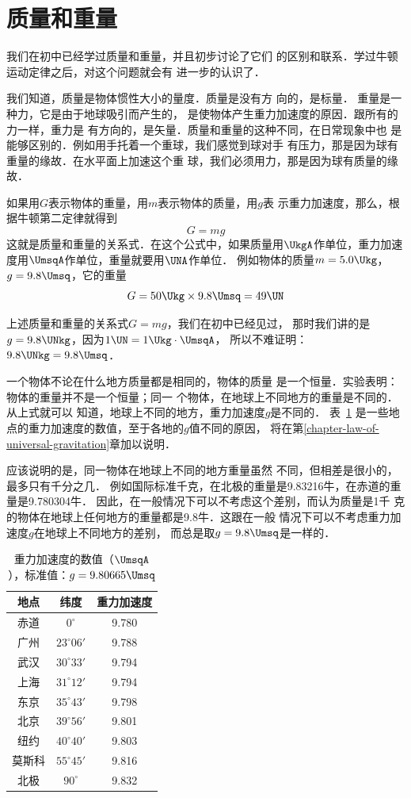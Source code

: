 \section{质量和重量}
我们在初中已经学过质量和重量，并且初步讨论了它们
的区别和联系．学过牛顿运动定律之后，对这个问题就会有
进一步的认识了．

我们知道，质量是物体惯性大小的量度．质量是没有方
向的，是标量．
重量是一种力，它是由于地球吸引而产生的，
是使物体产生重力加速度的原因．跟所有的力一样，重力是
有方向的，是矢量．质量和重量的这种不同，在日常现象中也
是能够区别的．例如用手托着一个重球，我们感觉到球对手
有压力，那是因为球有重量的缘故．在水平面上加速这个重
球，我们必须用力，那是因为球有质量的缘故．

如果用$G$表示物体的重量，用$m$表示物体的质量，用$g$表
示重力加速度，那么，根据牛顿第二定律就得到
\[ G=mg\]
这就是质量和重量的关系式．在这个公式中，如果质量用$\UkgA$作单位，重力加速度用$\UmsqA$作单位，重量就要用$\UNA$作单位．
例如物体的质量$m=5.0 \Ukg$，$g=9.8\Umsq$，它的重量
\[G=50 \Ukg \times 9.8\Umsq=49 \UN \]

上述质量和重量的关系式$G=mg$，我们在初中已经见过，
那时我们讲的是$g=9.8 \UNkg $，因为$1\UN=1\Ukg\cdot \UmsqA$，
所以不难证明：$9.8 \UNkg=9.8\Umsq$．


一个物体不论在什么地方质量都是相同的，物体的质量
是一个恒量．实验表明：物体的重量并不是一个恒量；同一
个物体，在地球上不同地方的重量是不同的．
从上式就可以
知道，地球上不同的地方，重力加速度$g$是不同的．
表~\ref{tab_A_3-4} 是一些地点的重力加速度的数值，至于各地的$g$值不同的原因，
将在第\ref{chapter-law-of-universal-gravitation}章加以说明．

应该说明的是，同一物体在地球上不同的地方重量虽然
不同，但相差是很小的，最多只有千分之几．
例如国际标准千克，在北极的重量是9.83216牛，在赤道的重量是9.780304牛．
因此，在一般情况下可以不考虑这个差别，而认为质量是1千
克的物体在地球上任何地方的重量都是9.8牛．这跟在一般
情况下可以不考虑重力加速度$g$在地球上不同地方的差别，
而总是取$g=9.8\Umsq$是一样的．

\begin{table}[htbp]
	\centering
	\caption{重力加速度的数值（$\UmsqA$），标准值：$g=9.80665\Umsq$}\label{tab_A_3-4}
	\begin{tabular}{ccc}
		\hline
		地点  &  纬度  &  重力加速度\\
		\hline
		赤道   & $0^\circ$   &  9.780\\
		广州  &  $23^\circ 06'$  &  9.788\\
		武汉  &  $30^\circ 33'$  &  9.794\\
		上海  &  $31^\circ 12'$  & 9.794 \\
		东京  & $35^\circ 43'$   & 9.798 \\
		北京  &  $39^\circ 56'$  & 9.801 \\
		纽约  & $40^\circ 40'$   & 9.803 \\
		莫斯科  &$55^\circ 45'$    & 9.816 \\
		北极  & $90^\circ$   & 9.832 \\
		\hline
	\end{tabular}
\end{table}

